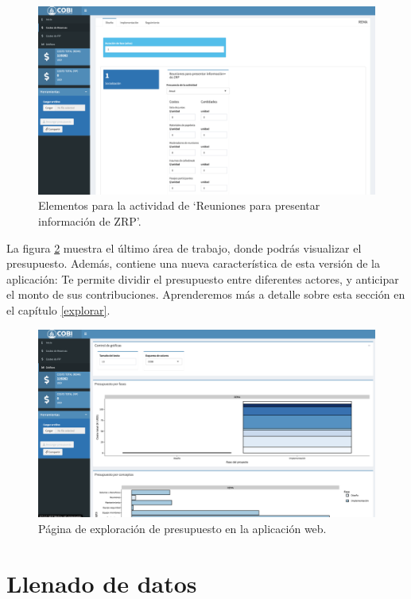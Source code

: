 \documentclass[
]{book}
\begin{document}
\begin{figure}
\centering
\includegraphics{images/Screen Shot 2022-07-25 at 3.08.10 PM.png}
\caption{\label{fig:elements}Elementos para la actividad de `Reuniones para presentar información de ZRP'.}
\end{figure}

La figura \ref{fig:viewing-page} muestra el último área de trabajo, donde podrás visualizar el presupuesto. Además, contiene una nueva característica de esta versión de la aplicación: Te permite dividir el presupuesto entre diferentes actores, y anticipar el monto de sus contribuciones. Aprenderemos más a detalle sobre esta sección en el capítulo \ref{explorar}.

\begin{figure}
\centering
\includegraphics{images/Screen Shot 2022-07-25 at 2.56.18 PM.png}
\caption{\label{fig:viewing-page}Página de exploración de presupuesto en la aplicación web.}
\end{figure}

\hypertarget{llenado}{%
\chapter{Llenado de datos}\label{llenado}}
\end{document}
